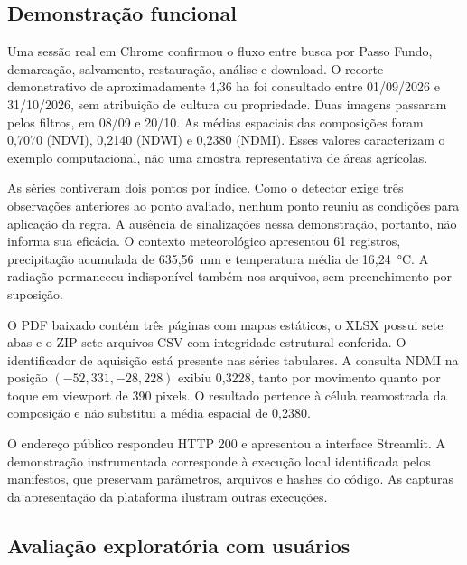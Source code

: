 \subsection{Demonstração funcional}

Uma sessão real em Chrome confirmou o fluxo entre busca por Passo Fundo, demarcação, salvamento, restauração, análise e download. O recorte demonstrativo de aproximadamente 4,36 ha foi consultado entre 01/09/2026 e 31/10/2026, sem atribuição de cultura ou propriedade. Duas imagens passaram pelos filtros, em 08/09 e 20/10. As médias espaciais das composições foram 0,7070 (NDVI), 0,2140 (NDWI) e 0,2380 (NDMI). Esses valores caracterizam o exemplo computacional, não uma amostra representativa de áreas agrícolas.

As séries contiveram dois pontos por índice. Como o detector exige três observações anteriores ao ponto avaliado, nenhum ponto reuniu as condições para aplicação da regra. A ausência de sinalizações nessa demonstração, portanto, não informa sua eficácia. O contexto meteorológico apresentou 61 registros, precipitação acumulada de 635,56~mm e temperatura média de 16,24~°C. A radiação permaneceu indisponível também nos arquivos, sem preenchimento por suposição.

O PDF baixado contém três páginas com mapas estáticos, o XLSX possui sete abas e o ZIP sete arquivos CSV com integridade estrutural conferida. O identificador de aquisição está presente nas séries tabulares. A consulta NDMI na posição $(-52{,}331,-28{,}228)$ exibiu 0,3228, tanto por movimento quanto por toque em viewport de 390 pixels. O resultado pertence à célula reamostrada da composição e não substitui a média espacial de 0,2380.

O endereço público respondeu HTTP 200 e apresentou a interface Streamlit. A demonstração instrumentada corresponde à execução local identificada pelos manifestos, que preservam parâmetros, arquivos e hashes do código. As capturas da apresentação da plataforma ilustram outras execuções.

\newpage
\subsection{Avaliação exploratória com usuários}



